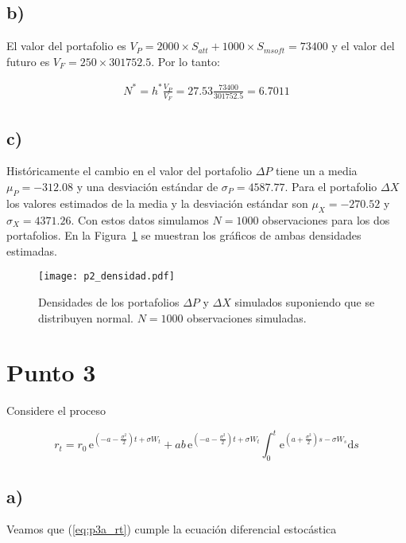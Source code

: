 \documentclass{tufte-handout}
\begin{document}
\subsection*{b)}

El valor del portafolio es $V_P=2000\times S_{att} + 1000 \times S_{msoft} = 73400$ y el valor del futuro es $V_F=250\times 301752.5$. Por lo tanto:

\begin{align*}
	N^* = h^* \frac{V_P}{V_F} = 27.53 \frac{73400}{301752.5} = 6.7011
\end{align*}


\subsection*{c)}

Históricamente el cambio en el valor del portafolio $\Delta P$ tiene un a media $\mu_P=-312.08$ y una desviación estándar de $\sigma_P=4587.77$. Para el portafolio $\Delta X$ los valores estimados de la media y la desviación estándar son $\mu_X=-270.52$ y $\sigma_X=4371.26$. Con estos datos simulamos $N=1000$ observaciones para los dos portafolios. En la Figura~\ref{fig:p2_densidad} se muestran los gráficos de ambas densidades estimadas.

\begin{figure}[!h]
    \texttt{[image: p2\_densidad.pdf]}
    \caption{Densidades de los portafolios $\Delta P$ y $\Delta X$ simulados suponiendo que se distribuyen normal. $N=1000$ observaciones simuladas.}
    \label{fig:p2_densidad}
\end{figure}

\section*{Punto 3}

Considere el proceso

\begin{equation} \label{eq:p3a_rt}
	r_t = r_0 \, \mathrm{e}^{(-a - \frac{\sigma^2}{2}) t + \sigma W_t}
			+ ab \, \mathrm{e}^{(-a - \frac{\sigma^2}{2}) t + \sigma W_t}
			\int_0^t
				\mathrm{e}^{(a + \frac{\sigma^2}{2}) s - \sigma W_s}
			\mathrm{d}s
\end{equation}

\subsection*{a)}

Veamos que (\ref{eq:p3a_rt}) cumple la ecuación diferencial estocástica
\end{document}
